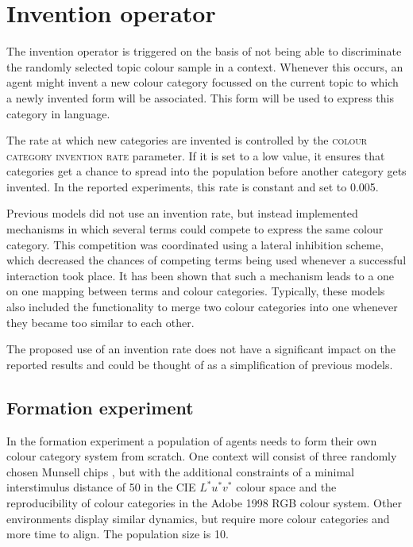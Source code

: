 \section{Invention operator}
\label{s:bcs-invention-operators}

The invention operator
is triggered on the basis of not being able
to discriminate the randomly selected topic colour sample in a
context. Whenever this occurs, an agent might invent a new colour
category focussed on the current topic to which a newly invented form
will be associated. This form will be used to express this category in
language.

\newpage
The rate at which new categories are invented is controlled by the
\textsc{colour category invention rate}
parameter. If it is set to a low value, it ensures that categories get
a chance to spread into the population before another category gets
invented. In the reported experiments, this rate is constant and set
to 0.005.

Previous models \citep{steels05coordinating, belpaeme05explaining,
  belpaeme07language} did not use an invention rate, but instead implemented
mechanisms in which several terms could compete to express the same
colour category. This competition was coordinated using a lateral
inhibition scheme, which decreased the chances of competing terms being used
whenever a successful interaction took place. It has been shown that
such a mechanism leads to a one on one mapping between terms and
colour categories. Typically, these models also included the
functionality to merge two colour categories into one whenever they
became too similar to each other. 

The proposed use of an invention rate does not have a significant
impact on the reported results and could be thought of as a
simplification of previous models.

\subsection{Formation experiment}
\label{s:formation-experiment}

In the formation experiment a population of agents needs to form
their own colour category system from scratch. One context will
consist of three randomly chosen Munsell chips \citep{newhall42final},
but with the additional constraints of a minimal
interstimulus distance of 50 in the CIE $L^*u^*v^*$ colour space and
the reproducibility of colour categories in the Adobe 1998 RGB
colour system. Other environments display similar dynamics, but
require more colour categories and more time to align. The population
size is 10.

